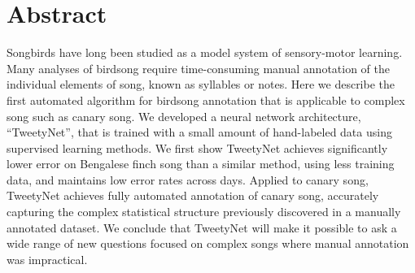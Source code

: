 \documentclass[10pt,letterpaper]{article}
\newcommand{\todoycpu}[1]{
\todo[bordercolor=purple, color=purple!40, size=\small]{#1}
}
\begin{document}
\section*{Abstract}

Songbirds have long been studied as a model system of sensory-motor learning. Many analyses of birdsong require time-consuming manual annotation of the individual elements of song, known as syllables or notes. Here we describe the first automated algorithm for birdsong annotation that is applicable to complex song such as canary song. We developed a neural network architecture, “TweetyNet”, that is trained with a small amount of hand-labeled data using supervised learning methods. We first show TweetyNet achieves significantly lower error on Bengalese finch song than a similar method, using less training data, and maintains low error rates across days. Applied to canary song, TweetyNet achieves fully automated annotation of canary song, accurately capturing the complex statistical structure previously discovered in a manually annotated dataset.  We conclude that TweetyNet will make it possible to ask a wide range of new questions focused on complex songs where manual annotation was impractical.

\linenumbers

\end{document}
